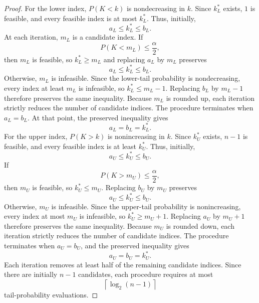 \documentclass{article}
\begin{document}
\begin{proof}
For the lower index, $P(K<k)$ is nondecreasing in $k$. Since $k_L^*$ exists, $1$ is feasible, and every feasible index is at most $k_L^*$. Thus, initially,
$$
a_L\leq k_L^*\leq b_L.
$$
At each iteration, $m_L$ is a candidate index. If
$$
P(K<m_L)\leq\frac{\alpha}{2},
$$
then $m_L$ is feasible, so $k_L^*\geq m_L$ and replacing $a_L$ by $m_L$ preserves
$$
a_L\leq k_L^*\leq b_L.
$$
Otherwise, $m_L$ is infeasible. Since the lower-tail probability is nondecreasing, every index at least $m_L$ is infeasible, so $k_L^*\leq m_L-1$. Replacing $b_L$ by $m_L-1$ therefore preserves the same inequality.
Because $m_L$ is rounded up, each iteration strictly reduces the number of candidate indices. The procedure terminates when $a_L=b_L$. At that point, the preserved inequality gives
$$
a_L=b_L=k_L^*.
$$
For the upper index, $P(K>k)$ is nonincreasing in $k$. Since $k_U^*$ exists, $n-1$ is feasible, and every feasible index is at least $k_U^*$. Thus, initially,
$$
a_U\leq k_U^*\leq b_U.
$$
If
$$
P(K>m_U)\leq\frac{\alpha}{2},
$$
then $m_U$ is feasible, so $k_U^*\leq m_U$. Replacing $b_U$ by $m_U$ preserves
$$
a_U\leq k_U^*\leq b_U.
$$
Otherwise, $m_U$ is infeasible. Since the upper-tail probability is nonincreasing, every index at most $m_U$ is infeasible, so $k_U^*\geq m_U+1$. Replacing $a_U$ by $m_U+1$ therefore preserves the same inequality.
Because $m_U$ is rounded down, each iteration strictly reduces the number of candidate indices. The procedure terminates when $a_U=b_U$, and the preserved inequality gives
$$
a_U=b_U=k_U^*.
$$
Each iteration removes at least half of the remaining candidate indices. Since there are initially $n-1$ candidates, each procedure requires at most
$$
\left\lceil\log_2(n-1)\right\rceil
$$
tail-probability evaluations.
\end{proof}
\end{document}
